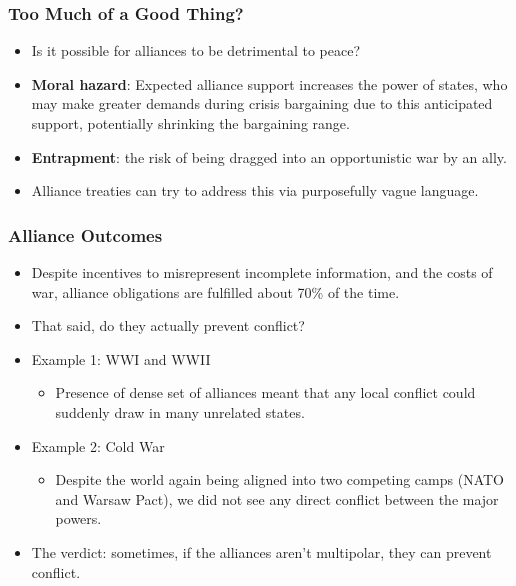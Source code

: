 \documentclass[handout]{beamer}
\begin{document}
\begin{frame} 
	\frametitle{\LARGE{Too Much of a Good Thing?}}
		\begin{itemize}
			\item Is it possible for alliances to be detrimental to peace? \pause
			\item \textbf{Moral hazard}: Expected alliance support increases the power of states, who may make greater demands during crisis bargaining due to this anticipated support, potentially shrinking the bargaining range. \pause
			\item \textbf{Entrapment}: the risk of being dragged into an opportunistic war by an ally. \pause  
			\item Alliance treaties can try to address this via purposefully vague language.
		\end{itemize}
\end{frame}

\begin{frame} 
	\frametitle{\LARGE{Alliance Outcomes}}
	\begin{itemize}
		\item Despite incentives to misrepresent incomplete information, and the costs of war, alliance obligations are fulfilled about 70\% of the time. \pause
		\item That said, do they actually prevent conflict? \pause
		\item Example 1:  WWI and WWII
		\begin{itemize}
			\item Presence of dense set of alliances meant that any local conflict could suddenly draw in many unrelated states.
		\end{itemize}
		\item Example 2:  Cold War
		\begin{itemize}
			\item Despite the world again being aligned into two competing camps (NATO and Warsaw Pact), we did not see any direct conflict between the major powers.
		\end{itemize}
		\item The verdict: sometimes, if the alliances aren't multipolar, they can prevent conflict.
	\end{itemize}
\end{frame}
\end{document}
